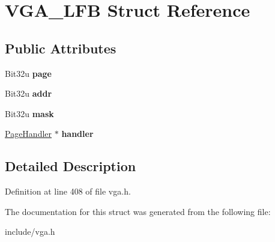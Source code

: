 \hypertarget{structVGA__LFB}{\section{V\-G\-A\-\_\-\-L\-F\-B Struct Reference}
\label{structVGA__LFB}
}
\subsection*{Public Attributes}
\begin{DoxyCompactItemize}
\item 
\hypertarget{structVGA__LFB_ac33c6c75c1e64552c88293115b1c1196}{Bit32u {\bfseries page}}\label{structVGA__LFB_ac33c6c75c1e64552c88293115b1c1196}

\item 
\hypertarget{structVGA__LFB_ad82dd223ea49e44ed0958ff21ae15f1d}{Bit32u {\bfseries addr}}\label{structVGA__LFB_ad82dd223ea49e44ed0958ff21ae15f1d}

\item 
\hypertarget{structVGA__LFB_aaf0a31db50d61b55ed20a81fb94de57c}{Bit32u {\bfseries mask}}\label{structVGA__LFB_aaf0a31db50d61b55ed20a81fb94de57c}

\item 
\hypertarget{structVGA__LFB_ac84a223414c76edc5fbd6742bfd8c720}{\hyperlink{classPageHandler}{Page\-Handler} $\ast$ {\bfseries handler}}\label{structVGA__LFB_ac84a223414c76edc5fbd6742bfd8c720}

\end{DoxyCompactItemize}


\subsection{Detailed Description}


Definition at line 408 of file vga.\-h.



The documentation for this struct was generated from the following file\-:\begin{DoxyCompactItemize}
\item 
include/vga.\-h\end{DoxyCompactItemize}
